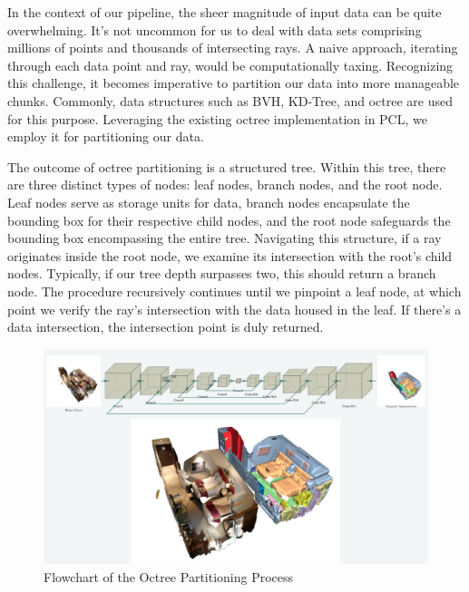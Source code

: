 \documentclass[11pt, a4paper,oneside,chapterprefix=false]{scrbook}
\begin{document}
In the context of our pipeline, the sheer magnitude of input data can be quite overwhelming. It's not uncommon for us to deal with data sets comprising millions of points and thousands of intersecting rays. A naive approach, iterating through each data point and ray, would be computationally taxing. Recognizing this challenge, it becomes imperative to partition our data into more manageable chunks. Commonly, data structures such as BVH, KD-Tree, and octree are used for this purpose. Leveraging the existing octree implementation in PCL, we employ it for partitioning our data.

\vspace{10pt}

The outcome of octree partitioning is a structured tree. Within this tree, there are three distinct types of nodes: leaf nodes, branch nodes, and the root node. Leaf nodes serve as storage units for data, branch nodes encapsulate the bounding box for their respective child nodes, and the root node safeguards the bounding box encompassing the entire tree. Navigating this structure, if a ray originates inside the root node, we examine its intersection with the root's child nodes. Typically, if our tree depth surpasses two, this should return a branch node. The procedure recursively continues until we pinpoint a leaf node, at which point we verify the ray's intersection with the data housed in the leaf. If there's a data intersection, the intersection point is duly returned.

\begin{figure}[H]
    \centering
    \includegraphics*[width=1.0\textwidth]{figures/Minkowski Engine.png}
    \caption{Flowchart of the Octree Partitioning Process}
    \label{fig:flowchart of the octree partitioning process}
\end{figure}
\end{document}
